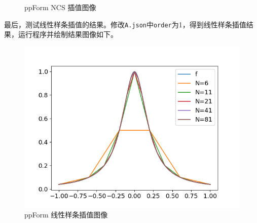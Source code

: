 \documentclass{ctexart}
\begin{document}
\begin{sloppypar}
\begin{figure}[H]
\begin{minipage}[t]{0.5\linewidth}
    \caption{ppForm NCS 插值图像}
  \end{minipage}
  \label{fig2}
\end{figure}
最后，测试线性样条插值的结果。修改\verb|A.json|中\verb|order|为1，得到线性样条插值结果，运行程序并绘制结果图像如下。
\begin{figure}[H]
\centering
\includegraphics[scale = 0.5]{fig//ProblemA_ppForm_1.png}
\caption{ppForm 线性样条插值图像}
\label{fig3}
\end{figure}


\end{sloppypar}
\end{document}
